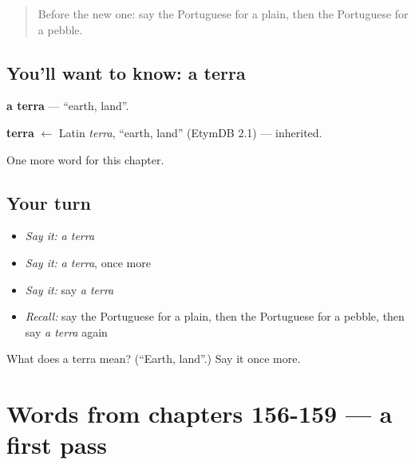 \label{lesson:PT-C164-terra}



\begin{quote}
Before the new one: say the Portuguese for a plain, then the Portuguese for a pebble.
\end{quote}

\subsection*{You'll want to know: a terra}
\textbf{a terra} — \textquotedblleft{}earth, land\textquotedblright{}.

\begin{cousinweb}
\textbf{terra} $\leftarrow$ Latin \emph{terra}, \textquotedblleft{}earth, land\textquotedblright{} (EtymDB 2.1) — inherited.
\end{cousinweb}

\begin{grammarlens}[title={What you've built}]
One more word for this chapter.
\end{grammarlens}

\subsection*{Your turn}
\begin{itemize}
\raggedright
  \item \emph{Say it:} \emph{a terra}
  \item \emph{Say it:} \emph{a terra}, once more
  \item \emph{Say it:} say \emph{a terra}
  \item \emph{Recall:} say the Portuguese for a plain, then the Portuguese for a pebble, then say \emph{a terra} again
\end{itemize}

\begin{tcolorbox}[breakable,colback=teal!4,colframe=teal!35!black,title={Before you move on}]
What does a terra mean? (\textquotedblleft{}Earth, land\textquotedblright{}.) Say it once more.
\end{tcolorbox}
\section[(dialogue)]{Words from chapters 156-159 — a first pass}

\label{lesson:PT-R164-first-pass-words-from-chapters-156-159}



